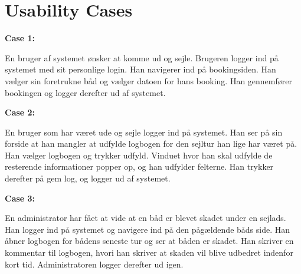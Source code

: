 \chapter{Usability Cases}\label{Usability_cases}

\textbf{Case 1:}

En bruger af systemet ønsker at komme ud og sejle. Brugeren logger ind på systemet med sit personlige login. Han navigerer ind på bookingsiden. Han vælger sin foretrukne båd og vælger datoen for hans booking. Han gennemfører bookingen og logger derefter ud af systemet.

\textbf{Case 2:}

En bruger som har været ude og sejle logger ind på systemet. Han ser på sin forside at han mangler at udfylde logbogen for den sejltur han lige har været på. Han vælger logbogen og trykker udfyld. Vinduet hvor han skal udfylde de resterende informationer popper op, og han udfylder felterne. Han trykker derefter på gem log, og logger ud af systemet.

\textbf{Case 3:}

En administrator har fået at vide at en båd er blevet skadet under en sejlads. Han logger ind på systemet og navigere ind på den pågældende båds side. Han åbner logbogen for bådens seneste tur og ser at båden er skadet. Han skriver en kommentar til logbogen, hvori han skriver at skaden vil blive udbedret indenfor kort tid. Administratoren logger derefter ud igen.